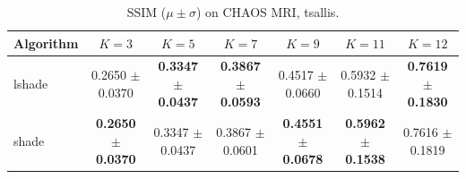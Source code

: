 \begin{table}[htbp]
\centering
\caption{SSIM ($\mu \pm \sigma$) on CHAOS MRI, tsallis.}
\label{tab:exp2-tsallis-ssim}
\begin{tabular}{lcccccc}
\toprule
Algorithm & $K=3$ & $K=5$ & $K=7$ & $K=9$ & $K=11$ & $K=12$ \\
\midrule
lshade & 0.2650 $\pm$ 0.0370 & \textbf{0.3347 $\pm$ 0.0437} & \textbf{0.3867 $\pm$ 0.0593} & 0.4517 $\pm$ 0.0660 & 0.5932 $\pm$ 0.1514 & \textbf{0.7619 $\pm$ 0.1830} \\
shade & \textbf{0.2650 $\pm$ 0.0370} & 0.3347 $\pm$ 0.0437 & 0.3867 $\pm$ 0.0601 & \textbf{0.4551 $\pm$ 0.0678} & \textbf{0.5962 $\pm$ 0.1538} & 0.7616 $\pm$ 0.1819 \\
\bottomrule
\end{tabular}
\end{table}